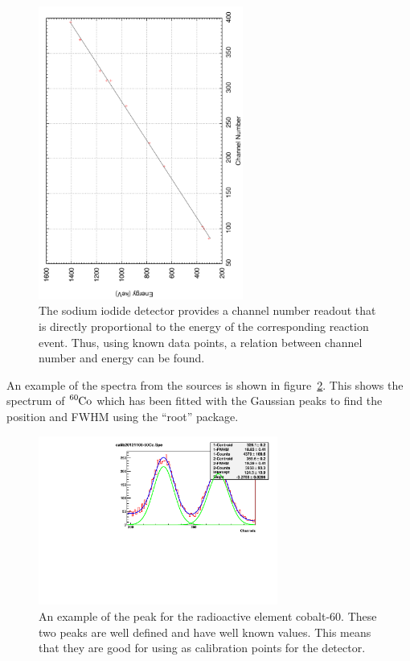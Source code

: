 \begin{figure}[ht]
	\centering
	\includegraphics[angle=270,width=0.6\textwidth]{calibration1NaI.pdf}
	\caption{The sodium iodide detector provides a channel number readout that is directly proportional to the energy of the corresponding reaction event. Thus, using known data points, a relation between channel number and energy can be found.\label{fig:naicalib}}
\end{figure}
An example of the spectra from the sources is shown in figure~\ref{fig:cobaltcalib}. This shows the spectrum of $\ce{^{60}Co}$ which has been fitted with the Gaussian peaks to find the position and FWHM using the ``root'' package\cite{root}.

\begin{figure}[ht]
	\centering
	\includegraphics[width=0.7\textwidth]{calib20121113-60Co.pdf}
	\caption{An example of the peak for the radioactive element cobalt-60. These two peaks are well defined and have well known values. This means that they are good for using as calibration points for the detector.\label{fig:cobaltcalib}}
\end{figure}

